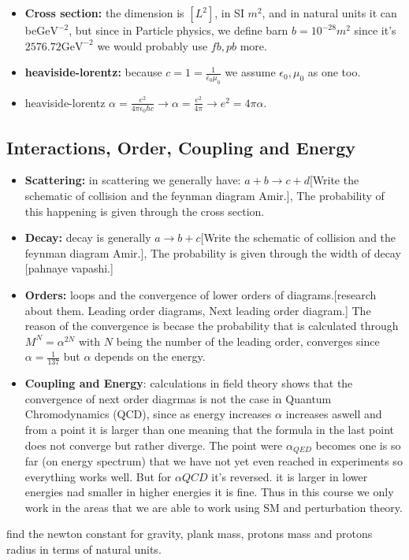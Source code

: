 \documentclass[10pt,a4paper]{article}
\newcounter{theo}
\newcommand{\gev}{\text{GeV}}
\begin{document}
\begin{itemize}
\begin{itemize}
                    \item \textbf{Cross section: } the dimension is $[L^2]$, in SI $m^2$, and in natural units it can be$\gev^{-2}$, but since in Particle physics, we define barn $b = 10^{-28}m^2$ since it's $2576.72\gev^{-2}$ we would probably use $fb, pb$ more.
                    \item \textbf{heaviside-lorentz: } because $c =1 =\frac{1}{\epsilon_0\mu_0}$ we assume $\epsilon_0,\mu_0$ as one too.
                    \item heaviside-lorentz $\alpha = \frac{e^2}{4\pi\epsilon_0\hbar c} \rightarrow \alpha = \frac{e^2}{4\pi} \rightarrow e^2 = 4\pi\alpha$.
               \end{itemize}
          \end{itemize}
          \subsection{Interactions, Order, Coupling and Energy}
          \begin{itemize}
               \item \textbf{Scattering: } in scattering we generally have: $a+b\rightarrow c+d$[Write the schematic of collision and the feynman diagram Amir.], The probability of this happening is given through the cross section.
               \item \textbf{Decay: } decay is generally $a\rightarrow b+c$[Write the schematic of collision and the feynman diagram Amir.], The probability is given through the width of decay [pahnaye vapashi.]
               \item \textbf{Orders: } loops and the convergence of lower orders of diagrams.[research about them. Leading order diagrams, Next leading order diagram.] The reason of the convergence is becase the probability that is calculated through $M^N = \alpha^{2N}$ with $N$ being the number of the leading order, converges since $\alpha =\frac{1}{137}$ but $\alpha$ depends on the energy.
               \item \textbf{Coupling and Energy}: calculations in field theory shows that the convergence of next order diagrmas is not the case in Quantum Chromodynamics (QCD), since as energy increases $\alpha$ increases aswell and from a point it is larger than one meaning that the formula in the last point does not converge but rather diverge. The point were $\alpha_{QED}$ becomes one is so far (on energy spectrum) that we have not yet even reached in experiments so everything works well. But for $\alpha{QCD}$ it's reversed. it is larger in lower energies nad smaller in higher energies it is fine. Thus in this course we only work in the areas that we are able to work using SM and perturbation theory.
          \end{itemize}
          \begin{ecx}
               find the newton constant for gravity, plank mass, protons mass and protons radius in terms of natural units.
          \end{ecx}
\end{document}
